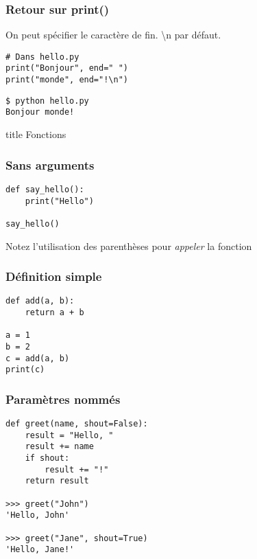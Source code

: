 \documentclass{beamer}
\begin{document}
\begin{frame}[fragile]
  \frametitle{Retour sur print()}

On peut spécifier le caractère de fin. \textbackslash n par défaut.

\begin{lstlisting}
# Dans hello.py
print("Bonjour", end=" ")
print("monde", end="!\n")
\end{lstlisting}

\begin{lstlisting}
$ python hello.py
Bonjour monde!
\end{lstlisting}

\end{frame}


\begin{frame}[fragile]
  \begin{beamercolorbox}[sep=8pt,center,shadow=true,rounded=true]{title}
    Fonctions
  \end{beamercolorbox}
\end{frame}


\begin{frame}[fragile]
  \frametitle{Sans arguments}

\begin{lstlisting}
def say_hello():
    print("Hello")

say_hello()
\end{lstlisting}

\vfill

Notez l'utilisation des parenthèses pour \emph{appeler} la fonction

\end{frame}


\begin{frame}[fragile]
  \frametitle{Définition simple}

\begin{lstlisting}
def add(a, b):
    return a + b

a = 1
b = 2
c = add(a, b)
print(c)
\end{lstlisting}

\end{frame}

\begin{frame}[fragile]
  \frametitle{Paramètres nommés}
\begin{lstlisting}
def greet(name, shout=False):
    result = "Hello, "
    result += name
    if shout:
        result += "!"
    return result

>>> greet("John")
'Hello, John'

>>> greet("Jane", shout=True)
'Hello, Jane!'
\end{lstlisting}


\end{frame}
\end{document}
